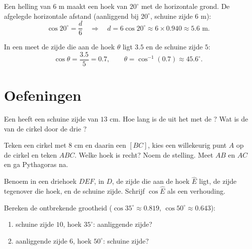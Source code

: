 \begin{example}\label{ex:g8:cosine:side}
Een helling van $6$ m maakt een hoek van $20^\circ$ met de horizontale grond.
De afgelegde horizontale afstand (aanliggend bij $20^\circ$, schuine zijde
$6$ m):
\[
\cos 20^\circ = \frac{d}{6}
\quad\Longrightarrow\quad
d = 6 \cos 20^\circ \approx 6 \times 0.940 \approx 5.6 \text{ m}.
\]
\end{example}

\begin{example}\label{ex:g8:cosine:angle}
In een  meet de zijde die aan de hoek $\theta$ ligt $3.5$ en
de schuine zijde $5$:
\[
\cos\theta = \frac{3.5}{5} = 0.7,
\qquad
\theta = \cos^{-1}(0.7) \approx 45.6^\circ .
\]
\end{example}

\section{Oefeningen}

\begin{exercise}[$\star$]\label{exo:g8:cosine:1}
Een  heeft een schuine zijde van $13$ cm. Hoe lang is de
 uit het  met de ? Wat is de  van de cirkel
door de drie ?
\end{exercise}

\begin{exercise}[$\star$]\label{exo:g8:cosine:2}
Teken een cirkel met  $8$ cm en daarin een  $[BC]$, kies een
willekeurig punt $A$ op de cirkel en teken $ABC$. Welke hoek is recht? Noem de
stelling. Meet $AB$ en $AC$ en ga Pythagoras na.
\end{exercise}

\begin{exercise}[$\star$]\label{exo:g8:cosine:3}
Benoem in een driehoek $DEF$,  in $D$, de zijde die aan de hoek
$\widehat E$ ligt, de zijde tegenover die hoek, en de schuine zijde. Schrijf
$\cos \widehat E$ als een verhouding.
\end{exercise}

\begin{exercise}[$\star$]\label{exo:g8:cosine:4}
Bereken de ontbrekende grootheid ($\cos 35^\circ \approx 0.819$,
$\cos 50^\circ \approx 0.643$):
\begin{enumerate}
  \item schuine zijde $10$, hoek $35^\circ$: aanliggende zijde?
  \item aanliggende zijde $6$, hoek $50^\circ$: schuine zijde?
\end{enumerate}
\end{exercise}

